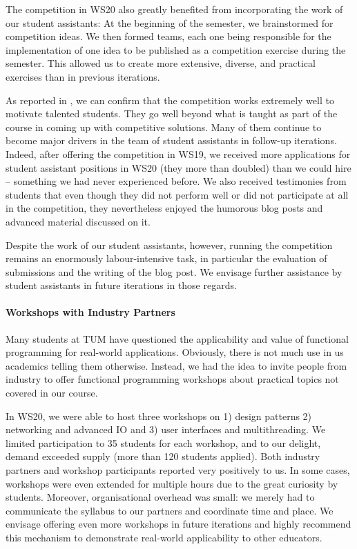The competition in WS20 also greatly benefited from incorporating the work of our student assistants:
At the beginning of the semester,
we brainstormed for competition ideas.
We then formed teams, each one being responsible for the
implementation of one idea to be published as a competition exercise during the semester.
This allowed us to create more extensive, diverse,
and practical exercises than in previous iterations.

As reported in \cite{next_1100},
we can confirm that the competition works extremely well to motivate talented students.
They go well beyond what is taught as part of the course in coming up with competitive solutions.
Many of them continue to become major drivers in
the team of student assistants in follow-up iterations.
Indeed, after offering the competition in WS19,
we received more applications for student assistant positions in WS20 (they more than doubled) than we could hire -- something we had never experienced before.
We also received testimonies from students that even though they did not perform well or did not participate at all in the competition,
they nevertheless enjoyed the humorous blog posts and advanced material discussed on it.

Despite the work of our student assistants,
however,
running the competition remains an enormously labour-intensive task,
in particular the evaluation of submissions and
the writing of the blog post.
We envisage further assistance by student assistants in future iterations in those regards.

\paragraph{Workshops with Industry Partners}
Many students at TUM have questioned the applicability and value of functional programming for real-world applications.
Obviously, there is not much use in us academics telling
them otherwise.
Instead, we had the idea to invite people from industry
to offer functional programming workshops about
practical topics not covered in our course.

In WS20,
we were able to host three workshops on 1) design patterns
2) networking and advanced IO and 3) user interfaces and multithreading.
We limited participation to 35 students for each workshop,
and to our delight, demand exceeded supply (more than 120 students applied).
Both industry partners and workshop participants
reported very positively to us.
In some cases,
workshops were even extended for multiple hours due to the great curiosity by students.
Moreover, organisational overhead was small:
we merely had to communicate the syllabus to our partners and coordinate time and place.
We envisage offering even more workshops in future iterations and highly recommend this mechanism to demonstrate real-world applicability to other educators.

